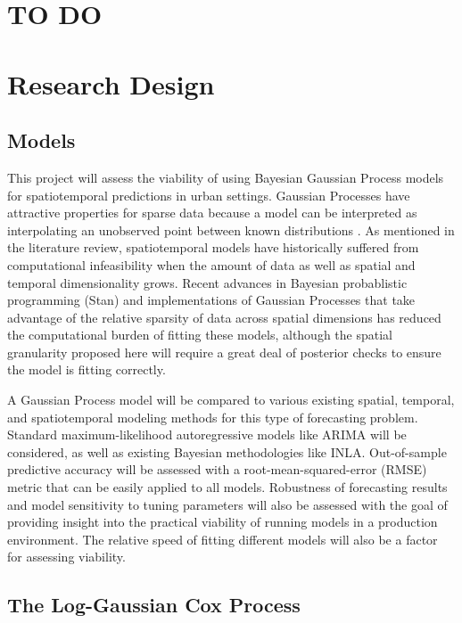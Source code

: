 \documentclass{article}
\begin{document}
\section{TO DO}

\listoftodos

\section{Research Design}


\subsection{Models}

This project will assess the viability of using Bayesian Gaussian Process models for spatiotemporal predictions in urban settings. Gaussian Processes have attractive properties for sparse data because a model can be interpreted as interpolating an unobserved point between known distributions . As mentioned in the literature review, spatiotemporal models have historically suffered from computational infeasibility when the amount of data as well as spatial and temporal dimensionality grows. Recent advances in Bayesian probablistic programming (Stan) and implementations of Gaussian Processes that take advantage of the relative sparsity of data across spatial dimensions has reduced the computational burden of fitting these models, although the spatial granularity proposed here will require a great deal of posterior checks to ensure the model is fitting correctly. \par

A Gaussian Process model will be compared to various existing spatial, temporal, and spatiotemporal modeling methods for this type of forecasting problem. Standard maximum-likelihood autoregressive models like ARIMA will be considered, as well as existing Bayesian methodologies like INLA. Out-of-sample predictive accuracy will be assessed with a root-mean-squared-error (RMSE) metric that
can be easily applied to all models. Robustness of forecasting results and model sensitivity to tuning parameters will also be assessed with the goal of providing insight into the practical viability of running models in a production environment. The relative speed of fitting different models will also be a factor for assessing viability. \par


\subsection{The Log-Gaussian Cox Process}
\end{document}
